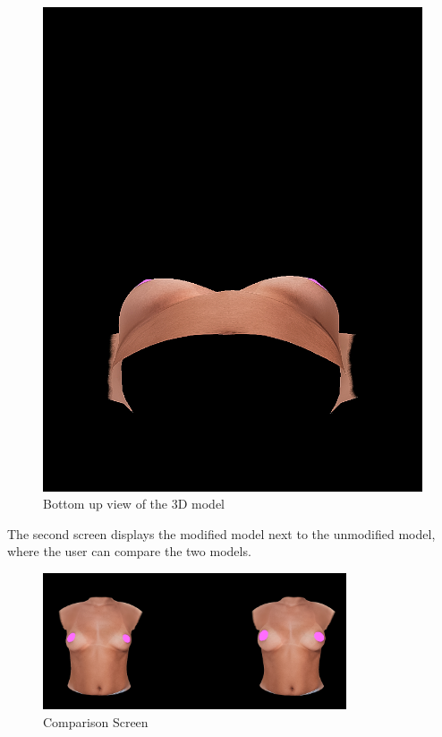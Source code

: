 \begin{figure}[H]
    \centering
    \includegraphics{figures/20230529-bottom_view.jpg}
    \caption{Bottom up view of the 3D model}
    \label{fig:bottom_view}
\end{figure}

The second screen displays the modified model next to the unmodified model, where the user can compare the two models.

\begin{figure}[H]
    \centering
    \includegraphics[width = 0.8\textwidth]{figures/20230529-comparison_screen.jpg}
    \caption{Comparison Screen}
    \label{fig:comparison_screen}
\end{figure}

